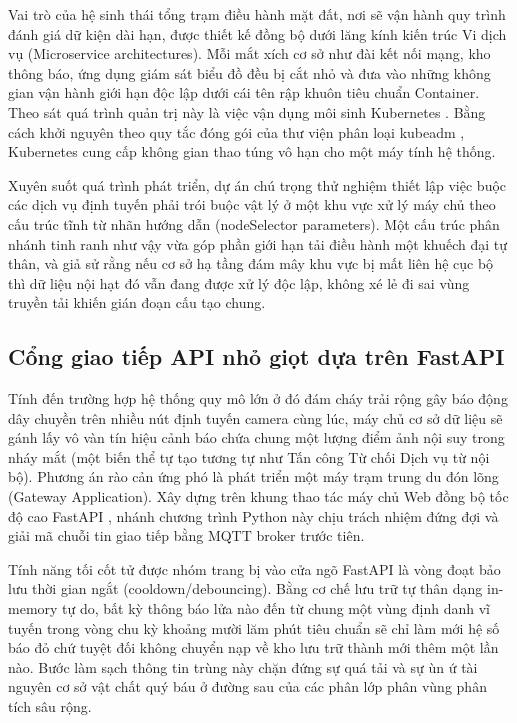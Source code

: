 \documentclass[12pt,a4paper]{report}
\begin{document}
Vai trò của hệ sinh thái tổng trạm điều hành mặt đất, nơi sẽ vận hành quy trình đánh giá dữ kiện dài hạn, được thiết kế đồng bộ dưới lăng kính kiến trúc Vi dịch vụ (Microservice architectures). Mỗi mắt xích cơ sở như đài kết nối mạng, kho thông báo, ứng dụng giám sát biểu đồ đều bị cắt nhỏ và đưa vào những không gian vận hành giới hạn độc lập dưới cái tên rập khuôn tiêu chuẩn Container. Theo sát quá trình quản trị này là việc vận dụng môi sinh Kubernetes \cite{kubernetes}. Bằng cách khởi nguyên theo quy tắc đóng gói của thư viện phân loại kubeadm \cite{kubeadm}, Kubernetes cung cấp không gian thao túng vô hạn cho một máy tính hệ thống.

Xuyên suốt quá trình phát triển, dự án chú trọng thử nghiệm thiết lập việc buộc các dịch vụ định tuyến phải trói buộc vật lý ở một khu vực xử lý máy chủ theo cấu trúc tĩnh từ nhãn hướng dẫn (nodeSelector parameters). Một cấu trúc phân nhánh tinh ranh như vậy vừa góp phần giới hạn tải điều hành một khuếch đại tự thân, và giả sử rằng nếu cơ sở hạ tầng đám mây khu vực bị mất liên hệ cục bộ thì dữ liệu nội hạt đó vẫn đang được xử lý độc lập, không xé lẻ đi sai vùng truyền tải khiến gián đoạn cấu tạo chung.

\subsection{Cổng giao tiếp API nhỏ giọt dựa trên FastAPI}

Tính đến trường hợp hệ thống quy mô lớn ở đó đám cháy trải rộng gây báo động dây chuyền trên nhiều nút định tuyến camera cùng lúc, máy chủ cơ sở dữ liệu sẽ gánh lấy vô vàn tín hiệu cảnh báo chứa chung một lượng điểm ảnh nội suy trong nháy mắt (một biến thể tự tạo tương tự như Tấn công Từ chối Dịch vụ từ nội bộ). Phương án rào cản ứng phó là phát triển một máy trạm trung du đón lõng (Gateway Application). Xây dựng trên khung thao tác máy chủ Web đồng bộ tốc độ cao FastAPI \cite{fastapi}, nhánh chương trình Python này chịu trách nhiệm đứng đợi và giải mã chuỗi tin giao tiếp bằng MQTT broker trước tiên.

Tính năng tối cốt tử được nhóm trang bị vào cửa ngõ FastAPI là vòng đoạt bảo lưu thời gian ngắt (cooldown/debouncing). Bằng cơ chế lưu trữ tự thân dạng in-memory tự do, bất kỳ thông báo lửa nào đến từ chung một vùng định danh vĩ tuyến trong vòng chu kỳ khoảng mười lăm phút tiêu chuẩn sẽ chỉ làm mới hệ số báo đỏ chứ tuyệt đối không chuyển nạp về kho lưu trữ thành mới thêm một lần nào. Bước làm sạch thông tin trùng này chặn đứng sự quá tải và sự ùn ứ tài nguyên cơ sở vật chất quý báu ở đường sau của các phân lớp phân vùng phân tích sâu rộng.
\end{document}
